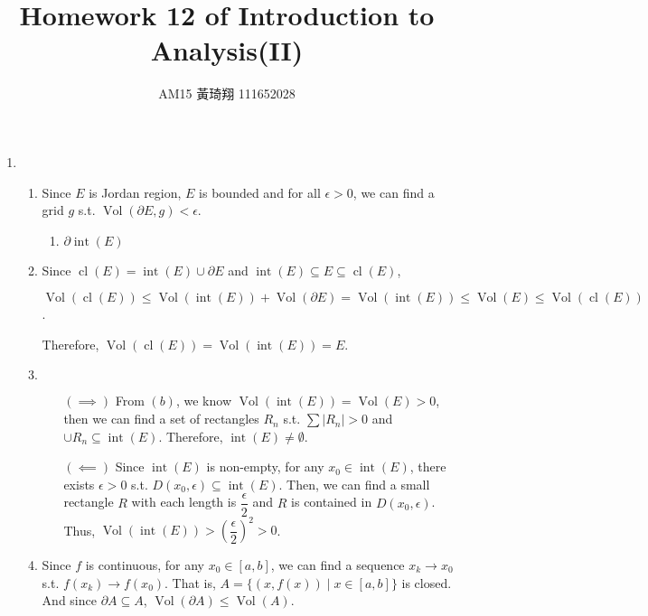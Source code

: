 \documentclass[12pt]{article}
\title{Homework 12 of Introduction to Analysis(II)}
\author{AM15 黃琦翔 111652028}
\DeclareMathOperator{\volume}{Vol}
\DeclareMathOperator{\interior}{int}
\DeclareMathOperator{\closure}{cl}
\newcommand{\boundary}{\partial}
\begin{document}
\maketitle
\begin{enumerate}
    \item \begin{enumerate}
        \item Since $E$ is Jordan region, $E$ is bounded and for all $\epsilon > 0$, we can find a grid $g$ s.t. $\volume(\partial E, g) < \epsilon$.
        \begin{enumerate}
            \item $\boundary\interior(E)$
        \end{enumerate}

        \item Since $\closure(E) = \interior(E) \cup \boundary E$ and $\interior(E)\subseteq E \subseteq \closure(E)$,

        $\volume(\closure(E)) \leq \volume(\interior(E)) + \volume(\boundary E) = \volume(\interior(E))\leq \volume(E) \leq \volume(\closure(E))$.

        Therefore, $\volume(\closure(E)) = \volume(\interior(E)) = E$.

        \item $\ $
        \begin{enumerate}
            \item[$(\implies)$] From $(b)$, we know $\volume(\interior(E)) = \volume(E) > 0$, 
            then we can find a set of rectangles $R_n$ s.t. $\sum |R_n| > 0$ and $\cup R_n \subseteq \interior(E)$.
            Therefore, $\interior(E) \neq \emptyset$.

            \item[$(\impliedby)$] Since $\interior(E)$ is non-empty, for any $x_0\in \interior(E)$, there exists $\epsilon > 0$ s.t. $D(x_0, \epsilon) \subseteq \interior(E)$.
            Then, we can find a small rectangle $R$ with each length is $\dfrac{\epsilon}{2}$ and $R$ is contained in $D(x_0, \epsilon)$.
            Thus, $\volume(\interior(E)) > \left(\dfrac{\epsilon}{2}\right)^2 > 0$.
        \end{enumerate}

        \item Since $f$ is continuous, for any $x_0 \in [a, b]$, we can find a sequence $x_k \to x_0$ s.t. $f(x_k) \to f(x_0)$.
        That is, $A = \{(x, f(x)) \mid x\in [a, b]\}$ is closed.
        And since $\boundary A \subseteq A$, $\volume(\boundary A) \leq \volume(A)$.
        

\end{enumerate}
\end{enumerate}
\end{document}
